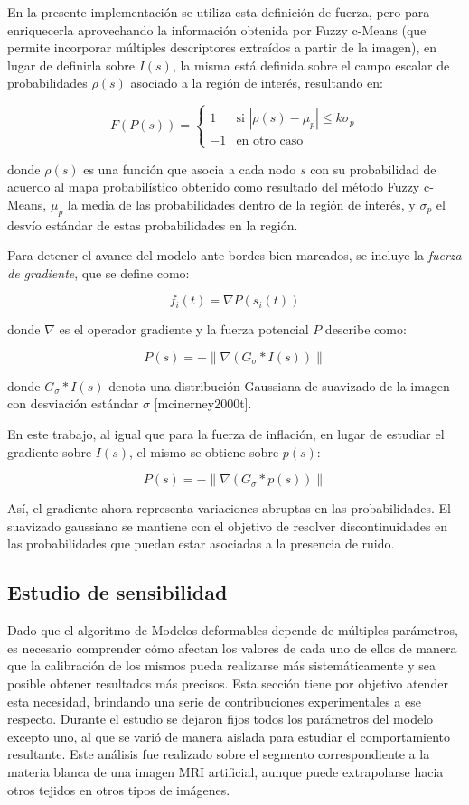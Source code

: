 En la presente implementación se utiliza esta definición de fuerza, pero para enriquecerla aprovechando la información obtenida por Fuzzy c-Means (que permite incorporar múltiples descriptores extraídos a partir de la imagen), en lugar de definirla sobre $I(s)$, la misma está definida sobre el campo escalar de probabilidades $\rho(s)$ asociado a la región de interés, resultando en:

$$ F(P(s)) = \begin{cases} 1 & \text{si } \left|\rho(s) - \mu_{p} \right| \leq k\sigma_{p} \\ -1 & \text{en otro caso} \end{cases}  $$

donde $\rho(s)$ es una función que asocia a cada nodo $s$ con su probabilidad de acuerdo al mapa probabilístico obtenido como resultado del método Fuzzy c-Means, $\mu_{p}$ la media de las probabilidades dentro de la región de interés, y $\sigma_{p}$ el desvío estándar de estas probabilidades en la región.

Para detener el avance del modelo ante bordes bien marcados, se incluye la \emph{fuerza de gradiente}, que se define como:

$$ f_{i}(t) = \nabla P(s_{i}(t)) $$

donde $\nabla$ es el operador gradiente y la fuerza potencial $P$ describe como:

$$ P(s) = - \left\| \nabla(G_{\sigma} * I(s)) \right\| $$ \label{eq:zz}

donde $G_{\sigma} * I(s)$ denota una distribución Gaussiana de suavizado de la imagen con desviación estándar $\sigma$ [mcinerney2000t].

En este trabajo, al igual que para la fuerza de inflación, en lugar de estudiar el gradiente sobre $I(s)$, el mismo se obtiene sobre $p(s)$:

$$ P(s) = - \left\| \nabla(G_{\sigma} * p(s)) \right\| $$

Así, el gradiente ahora representa variaciones abruptas en las probabilidades. El suavizado gaussiano se mantiene con el objetivo de resolver discontinuidades en las probabilidades que puedan estar asociadas a la presencia de ruido.

\subsection{Estudio de sensibilidad}\label{section:estudio_de_sensibilidad}
Dado que el algoritmo de Modelos deformables depende de múltiples parámetros, es necesario comprender cómo afectan los valores de cada uno de ellos de manera que la calibración de los mismos pueda realizarse más sistemáticamente y sea posible obtener resultados más precisos. Esta sección tiene por objetivo atender esta necesidad, brindando una serie de contribuciones experimentales a ese respecto. Durante el estudio se dejaron fijos todos los parámetros del modelo excepto uno, al que se varió de manera aislada para estudiar el comportamiento resultante. Este análisis fue realizado sobre el segmento correspondiente a la materia blanca de una imagen MRI artificial, aunque puede extrapolarse hacia otros tejidos en otros tipos de imágenes.

